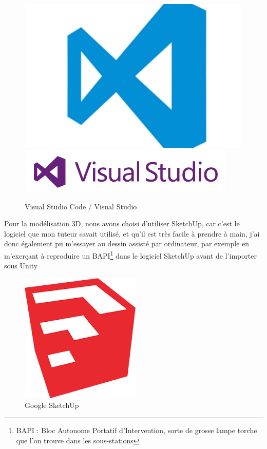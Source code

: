 \documentclass[a4paper]{article}
\begin{document}
    \begin{figure}[H]
        \centering
        \includegraphics[scale=0.05]{img/Logo-VSCode}
        \hspace{10pt}
        \includegraphics[scale=0.5]{img/logo-visual-studio}
        \caption{Visual Studio Code / Visual Studio}
    \end{figure}

    Pour la modélisation 3D, nous avons choisi d'utiliser SketchUp, car c'est le logiciel que mon tuteur savait utilisé, et qu'il est très facile à prendre à main, j'ai donc également pu m'essayer au dessin assisté par ordinateur, par exemple en m'exerçant à reproduire un BAPI\footnote{BAPI : Bloc Autonome Portatif d'Intervention, sorte de grosse lampe torche que l'on trouve dans les sous-stations} dans le logiciel SketchUp avant de l'importer sous Unity \\

    \begin{figure}[H]
        \centering
        \includegraphics[scale=0.5]{img/Logo-skp}
        \caption{Google SketchUp}
    \end{figure}
\end{document}
